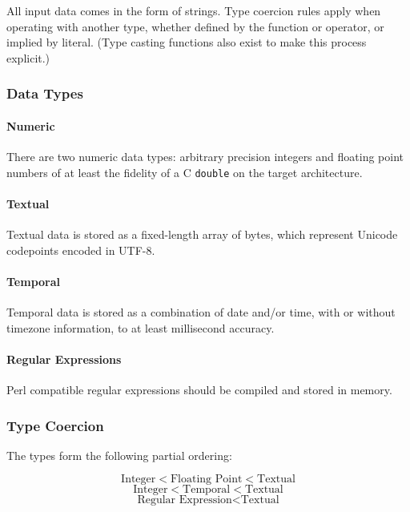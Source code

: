 All input data comes in the form of strings. Type coercion rules apply
when operating with another type, whether defined by the function or
operator, or implied by literal. (Type casting functions also exist to
make this process explicit.)

\subsubsection{Data Types}

\paragraph{Numeric}

There are two numeric data types: arbitrary precision integers and
floating point numbers of at least the fidelity of a C \texttt{double}
on the target architecture.

\paragraph{Textual}

Textual data is stored as a fixed-length array of bytes, which represent
Unicode codepoints encoded in UTF-8.

\paragraph{Temporal}


Temporal data is stored as a combination of date and/or time, with or
without timezone information, to at least millisecond accuracy.

\paragraph{Regular Expressions}


Perl compatible regular expressions should be compiled and stored in
memory.

\subsubsection{Type Coercion}

The types form the following partial ordering:

$$\textrm{Integer} < \textrm{Floating Point} < \textrm{Textual}$$
$$\textrm{Integer} < \textrm{Temporal} < \textrm{Textual}$$
$$\textrm{Regular Expression} < \textrm{Textual}$$

